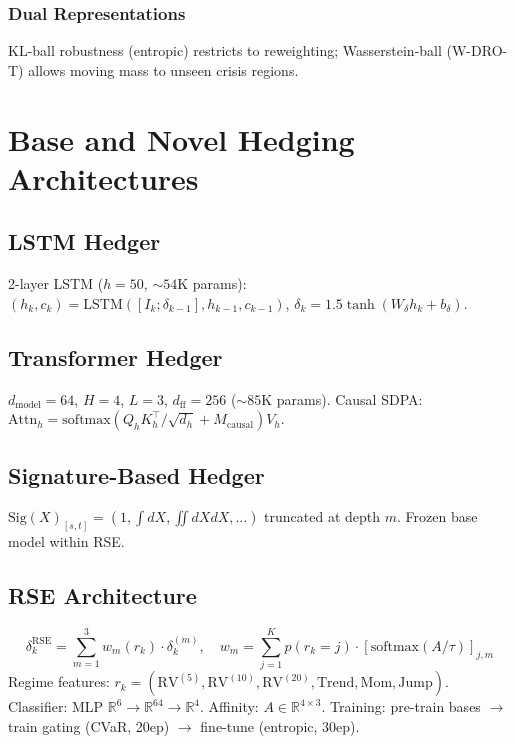 \documentclass[11pt]{article}
\newcommand{\R}{\mathbb{R}}
\begin{document}
\subsubsection{Dual Representations}
KL-ball robustness (entropic) restricts to reweighting; Wasserstein-ball (W-DRO-T) allows moving mass to unseen crisis regions.

\section{Base and Novel Hedging Architectures}

\subsection{LSTM Hedger}
2-layer LSTM ($h{=}50$, ${\sim}54$K params): $(h_k, c_k) = \mathrm{LSTM}([I_k; \delta_{k-1}], h_{k-1}, c_{k-1})$, $\delta_k = 1.5\tanh(W_\delta h_k + b_\delta)$.

\subsection{Transformer Hedger}
$d_{\mathrm{model}}{=}64$, $H{=}4$, $L{=}3$, $d_{\mathrm{ff}}{=}256$ (${\sim}85$K params). Causal SDPA: $\mathrm{Attn}_h = \mathrm{softmax}(Q_hK_h^\top/\sqrt{d_h} + M_{\mathrm{causal}})V_h$.

\subsection{Signature-Based Hedger}
$\mathrm{Sig}(X)_{[s,t]} = (1, \int dX, \iint dXdX, \ldots)$ truncated at depth $m$. Frozen base model within RSE.

\subsection{RSE Architecture}
\begin{equation}
\delta_k^{\mathrm{RSE}} = \sum_{m=1}^{3} w_m(r_k) \cdot \delta_k^{(m)}, \quad w_m = \sum_{j=1}^K p(r_k{=}j) \cdot [\mathrm{softmax}(A/\tau)]_{j,m}
\end{equation}
Regime features: $r_k = (\mathrm{RV}^{(5)}, \mathrm{RV}^{(10)}, \mathrm{RV}^{(20)}, \mathrm{Trend}, \mathrm{Mom}, \mathrm{Jump})$. Classifier: MLP $\R^6 \to \R^{64} \to \R^4$. Affinity: $A \in \R^{4\times3}$. Training: pre-train bases $\to$ train gating (CVaR, 20ep) $\to$ fine-tune (entropic, 30ep).
\end{document}
